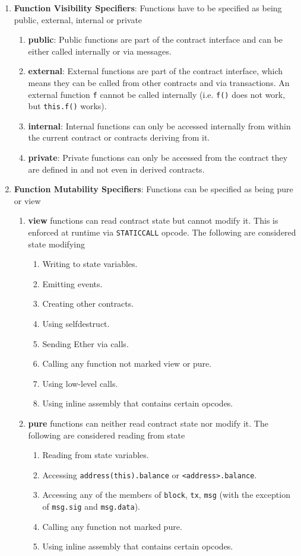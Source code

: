 \begin{enumerate}
\item\textbf{Function Visibility Specifiers}: Functions have to be specified as being public, external, internal or private
    \begin{enumerate}
    \item\textbf{public}: Public functions are part of the contract interface and can be either called internally or via messages.
    \item\textbf{external}: External functions are part of the contract interface, which means they can be called from other contracts and via transactions. An external function \verb|f| cannot be called internally (i.e. \verb|f()| does not work, but \verb|this.f()| works).
    \item\textbf{internal}: Internal functions can only be accessed internally from within the current contract or contracts deriving from it.
    \item\textbf{private}: Private functions can only be accessed from the contract they are defined in and not even in derived contracts.
    \end{enumerate}

\item\textbf{Function Mutability Specifiers}: Functions can be specified as being pure or view
    \begin{enumerate}
    \item\textbf{view} functions can read contract state but cannot modify it. This is enforced at runtime via \verb|STATICCALL| opcode. The following are considered state modifying
        \begin{enumerate}
        \item Writing to state variables.
        \item Emitting events.
        \item Creating other contracts.
        \item Using selfdestruct.
        \item Sending Ether via calls.
        \item Calling any function not marked view or pure.
        \item Using low-level calls.
        \item Using inline assembly that contains certain opcodes.
        \end{enumerate}
    \item\textbf{pure} functions can neither read contract state nor modify it. The following are considered reading from state
        \begin{enumerate}
        \item Reading from state variables.
        \item Accessing \verb|address(this).balance| or \verb|<address>.balance|.
        \item Accessing any of the members of \verb|block|, \verb|tx|, \verb|msg| (with the exception of \verb|msg.sig| and \verb|msg.data|).
        \item Calling any function not marked pure.
        \item Using inline assembly that contains certain opcodes.
        \end{enumerate}


\end{enumerate}
\end{enumerate}
